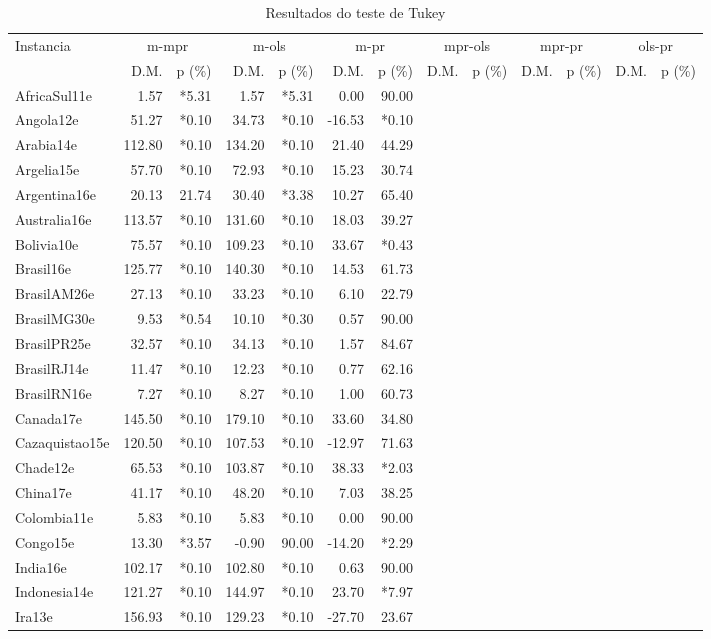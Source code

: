 \begin{landscape}
\begin{table}[htb]

\caption{Resultados do teste de Tukey}
\label{tab:resultados_tukey}
\begin{tabular}{@{}l|rr|rr|rr|rr|rr|rr@{}}
\toprule
Instancia&\multicolumn{2}{|c|}{m-mpr}&\multicolumn{2}{|c|}{m-ols}&\multicolumn{2}{|c|}{m-pr}&\multicolumn{2}{|c|}{mpr-ols}&\multicolumn{2}{|c|}{mpr-pr}&\multicolumn{2}{|c|}{ols-pr}\\
&D.M.&p (\%)&D.M.&p (\%)&D.M.&p (\%)&D.M.&p (\%)&D.M.&p (\%)&D.M.&p (\%)\\\midrule
AfricaSul11e&1.57&*5.31&1.57&*5.31&0.00&90.00\\
Angola12e&51.27&*0.10&34.73&*0.10&-16.53&*0.10\\
Arabia14e&112.80&*0.10&134.20&*0.10&21.40&44.29\\
Argelia15e&57.70&*0.10&72.93&*0.10&15.23&30.74\\
Argentina16e&20.13&21.74&30.40&*3.38&10.27&65.40\\
Australia16e&113.57&*0.10&131.60&*0.10&18.03&39.27\\
Bolivia10e&75.57&*0.10&109.23&*0.10&33.67&*0.43\\
Brasil16e&125.77&*0.10&140.30&*0.10&14.53&61.73\\
BrasilAM26e&27.13&*0.10&33.23&*0.10&6.10&22.79\\
BrasilMG30e&9.53&*0.54&10.10&*0.30&0.57&90.00\\
BrasilPR25e&32.57&*0.10&34.13&*0.10&1.57&84.67\\
BrasilRJ14e&11.47&*0.10&12.23&*0.10&0.77&62.16\\
BrasilRN16e&7.27&*0.10&8.27&*0.10&1.00&60.73\\
Canada17e&145.50&*0.10&179.10&*0.10&33.60&34.80\\
Cazaquistao15e&120.50&*0.10&107.53&*0.10&-12.97&71.63\\
Chade12e&65.53&*0.10&103.87&*0.10&38.33&*2.03\\
China17e&41.17&*0.10&48.20&*0.10&7.03&38.25\\
Colombia11e&5.83&*0.10&5.83&*0.10&0.00&90.00\\
Congo15e&13.30&*3.57&-0.90&90.00&-14.20&*2.29\\
India16e&102.17&*0.10&102.80&*0.10&0.63&90.00\\
Indonesia14e&121.27&*0.10&144.97&*0.10&23.70&*7.97\\
Ira13e&156.93&*0.10&129.23&*0.10&-27.70&23.67\\

\end{tabular}
\end{table}
\end{landscape}
